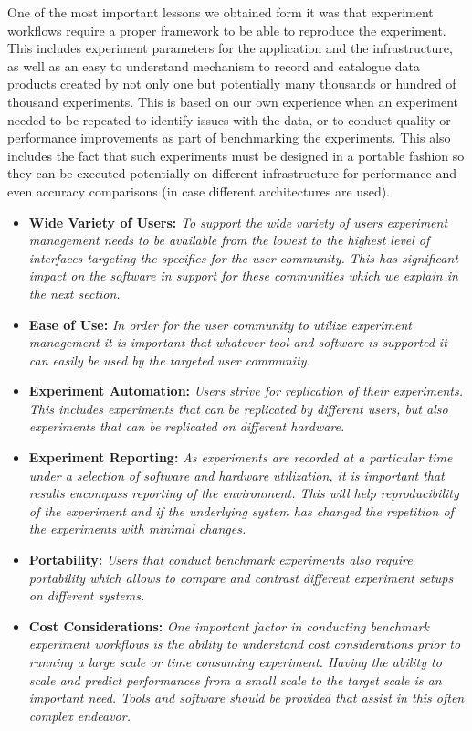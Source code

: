 \documentclass[utf8]{FrontiersinVancouver} %
\begin{document}
One of the most important lessons we obtained form it was that experiment workflows require a proper framework to be able to reproduce the experiment. This includes experiment parameters for the application and the infrastructure, as well as an easy to understand mechanism to record and catalogue data products created by not only one but potentially many thousands or hundred of thousand experiments. This is based on our own experience when an experiment needed to be repeated to identify issues with the data, or to conduct quality or performance improvements as part of benchmarking the experiments. This also includes the fact that such experiments must be designed in a portable fashion so they can be executed potentially on different infrastructure for performance and even accuracy comparisons (in case different architectures are used).


\begin{BOX}

\begin{itemize}

\item {\bf Wide Variety of Users:} {\it To support the wide variety of users experiment management needs to be available from the lowest to the highest level of interfaces targeting the specifics for the user community. This has significant impact on the software in support for these communities which we explain in the next section.}
\item {\bf Ease of Use:} {\it In order for the user community to utilize experiment management it is important that whatever tool and software is supported it can easily be used by the targeted user community.}
\item {\bf Experiment Automation:} {\it Users strive for replication of their experiments. This includes experiments that can be replicated by different users, but also experiments that can be replicated on different hardware.}
\item {\bf Experiment Reporting:} {\it As experiments are recorded at a particular time under a selection of software and hardware utilization, it is important that results encompass reporting of the environment. This will help reproducibility of the experiment and if the underlying system has changed the repetition of the experiments with minimal changes.}
\item {\bf Portability:} {\it Users that conduct benchmark experiments also require portability which allows to compare and contrast different experiment setups on different systems.}
\item {\bf Cost Considerations:} {\it One important factor in conducting benchmark experiment workflows is the ability to understand cost considerations prior to running a large scale or time consuming experiment. Having the ability to scale and predict performances from a small scale to the target scale is an important need. Tools and software should be provided that assist in this often complex endeavor.}

\end{itemize}
    
\end{BOX}
\end{document}
